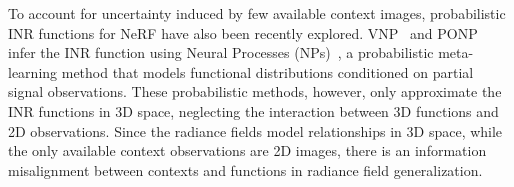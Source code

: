 To account for uncertainty induced by few available context images, probabilistic INR functions for NeRF \citep{gu2023generalizable, guo2023versatile, kosiorek2021nerf} have also been recently explored. VNP~\citep{guo2023versatile} and PONP~\citep{gu2023generalizable} infer the INR function using Neural Processes (NPs)~\citep{bruinsma2023autoregressive, garnelo2018neural, wang2020doubly, shen2024episodic}, a probabilistic meta-learning method that models functional distributions conditioned on partial signal observations.
These probabilistic methods, however, only approximate the INR functions in 3D space, neglecting the interaction between 3D functions and 2D observations. 
Since the radiance fields model relationships in 3D space, while the only available context observations are 2D images, there is an information misalignment between contexts and functions in radiance field generalization.




